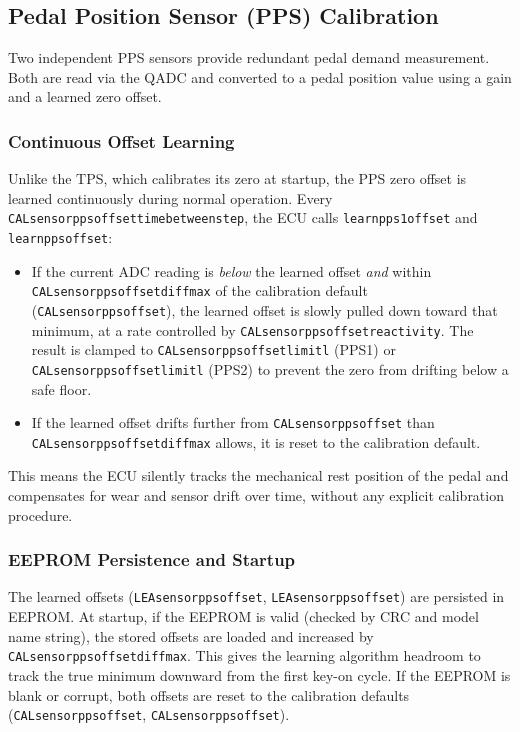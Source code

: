 \documentclass[a4paper,11pt]{article}
\renewcommand{\_}{\oldunderscore\allowbreak}
\begin{document}
\subsection{Pedal Position Sensor (PPS) Calibration}

Two independent PPS sensors provide redundant pedal demand measurement. Both are
read via the QADC and converted to a pedal position value using a gain and a
learned zero offset.

\subsubsection*{Continuous Offset Learning}

Unlike the TPS, which calibrates its zero at startup, the PPS zero offset is
learned continuously during normal operation. Every
\texttt{CAL\_sensor\_pps\_offset\_time\_between\_step}, the ECU calls
\texttt{learn\_pps1\_offset} and \texttt{learn\_pps\_2\_offset}:

\begin{itemize}
\item If the current ADC reading is \emph{below} the learned offset
      \emph{and} within \texttt{CAL\_sensor\_pps\_offset\_diff\_max} of the
      calibration default (\texttt{CAL\_sensor\_pps\_1\_offset}), the learned
      offset is slowly pulled down toward that minimum, at a rate controlled by
      \texttt{CAL\_sensor\_pps\_offset\_reactivity}. The result is clamped to
      \texttt{CAL\_sensor\_pps\_1\_offset\_limit\_l} (PPS1) or
      \texttt{CAL\_sensor\_pps\_2\_offset\_limit\_l} (PPS2) to prevent the
      zero from drifting below a safe floor.
\item If the learned offset drifts further from \texttt{CAL\_sensor\_pps\_1\_offset}
      than \texttt{CAL\_sensor\_pps\_offset\_diff\_max} allows, it is reset to
      the calibration default.
\end{itemize}

This means the ECU silently tracks the mechanical rest position of the
pedal and compensates for wear and sensor drift over time, without any
explicit calibration procedure.

\subsubsection*{EEPROM Persistence and Startup}

The learned offsets (\texttt{LEA\_sensor\_pps\_1\_offset},
\texttt{LEA\_sensor\_pps\_2\_offset}) are persisted in EEPROM. At startup,
if the EEPROM is valid (checked by CRC and model name string), the stored
offsets are loaded and increased by \texttt{CAL\_sensor\_pps\_offset\_diff\_max}.
This gives the learning algorithm headroom to track the true minimum downward
from the first key-on cycle. If the EEPROM is blank or corrupt, both offsets are reset to the
calibration defaults (\texttt{CAL\_sensor\_pps\_1\_offset},
\texttt{CAL\_sensor\_pps\_2\_offset}).
\end{document}
